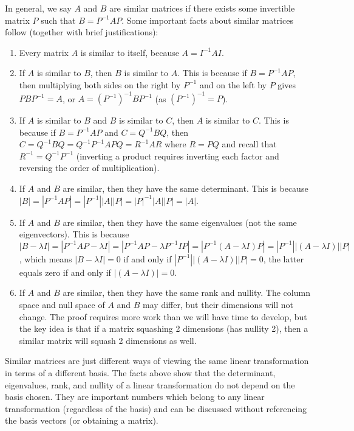 \documentclass[10pt]{article}
\theoremstyle{plain}
\theoremstyle{box}
\begin{document}
In general, we say $A$ and $B$ are similar matrices if there exists some invertible matrix $P$ such that $B=P^{-1}AP$. Some important facts about similar matrices follow (together with brief justifications):
\begin{enumerate}
	\item Every matrix $A$ is similar to itself, because $A=I^{-1}AI$. 
	\item If $A$ is similar to $B$, then $B$ is similar to $A$. This is because if $B=P^{-1}AP$, then multiplying both sides on the right by $P^{-1}$ and on the left by $P$ gives $PBP^{-1}=A$, or $A = (P^{-1})^{-1}BP^{-1}$ (as $(P^{-1})^{-1}=P$).  
	\item If $A$ is similar to $B$ and $B$ is similar to $C$, then $A$ is similar to $C$. This is because if $B=P^{-1}AP$ and $C=Q^{-1}BQ$, then $C=Q^{-1}BQ = Q^{-1}P^{-1}APQ = R^{-1}AR$ where $R=PQ$ and recall that $R^{-1} = Q^{-1}P^{-1}$ (inverting a product requires inverting each factor and reversing the order of multiplication).
	\item If $A$ and $B$ are similar, then they have the same determinant.  This is because $|B|=|P^{-1}AP| = |P^{-1}||A||P| = |P|^{-1}|A||P| =|A|$.
	\item If $A$ and $B$ are similar, then they have the same eigenvalues (not the same eigenvectors). This is because $|B-\lambda I|=|P^{-1}AP-\lambda I|=|P^{-1}AP-\lambda P^{-1}IP|=|P^{-1}(A-\lambda I)P|=|P^{-1}||(A-\lambda I)||P|$, which means $|B-\lambda I| = 0 $ if and only if $|P^{-1}||(A-\lambda I)||P|=0$, the latter equals zero if and only if $|(A-\lambda I)|=0$.
	\item If $A$ and $B$ are similar, then they have the same rank and nullity.  The column space and null space of $A$ and $B$ may differ, but their dimensions will not change.  The proof requires more work than we will have time to develop, but the key idea is that if a matrix squashing 2 dimensions (has nullity 2), then a similar matrix will squash 2 dimensions as well.
\end{enumerate}
Similar matrices are just different ways of viewing the same linear transformation in terms of a different basis. The facts above show that the determinant, eigenvalues, rank, and nullity of a linear transformation do not depend on the basis chosen. They are important numbers which belong to any linear transformation (regardless of the basis) and can be discussed without referencing the basis vectors (or obtaining a matrix).
\end{document}
